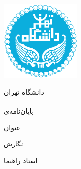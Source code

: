 
\begin{center}
\thispagestyle{empty}
\includegraphics[width=4cm]{images/UT_logo} \\
\begin{Large}
دانشگاه تهران \\
\fadepart \\ [1cm]
پایان‌نامه‌ی 
\falevel \\

\famajor

\end{Large}

\vskip 1cm

\large{عنوان}   \textbf{\huge{\fatitle}}

\vskip 1.5cm
\large{نگارش} \\ \Large{\faAuthor}

\vskip 1.5cm
\large{استاد راهنما } \\ \Large{\fasupervisor}

\vskip 1.5cm
\large{\fadate}
\end{center}

